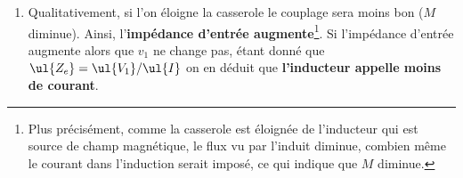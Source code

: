 \documentclass[a4paper, 10pt, final, garamond]{book}
\begin{document}
\begin{enumerate}
\begin{rrema}{Remarque}
		      résultat à propos du transformateur.
		      \bigbreak
		      Remarque aussi que la différence de nombre de spires dans l'inducteur et
		      l'induit permet au courant à l'induit d'être nettement supérieur au
		      courant à l'inducteur, et donc de fournir davantage d'effet \textsc{Joule}
		      dans le fond de la casserole que dans la plaque.
	      \end{rrema}
	\item Qualitativement, si l'on éloigne la casserole le couplage sera moins
	      bon ($M$ diminue). Ainsi, l'\textbf{impédance d'entrée
		      augmente}\footnote{Plus précisément, comme la casserole est éloignée de
		      l'inducteur qui est source de champ magnétique, le flux vu par
		      l'induit diminue, combien même le courant dans l'induction serait
		      imposé, ce qui indique que $M$ diminue.}. Si l'impédance d'entrée
	      augmente alors que $v_1$ ne change pas, étant donné que $\ul{Z_e} =
		      \ul{V_1}/\ul{I}$ on en déduit que \textbf{l'inducteur appelle moins de
		      courant}.
\end{enumerate}
\end{document}
